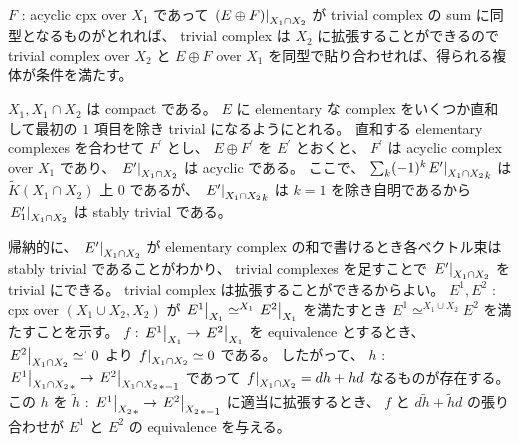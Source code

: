 \documentclass[dvipdfmx]{jsarticle}
\begin{document}
\begin{Proof}[A.2]
\itemprof
  \(F\) : acyclic cpx over \(X_1\) であって \(\left. {(E \oplus F)} \right| _{X_1 \cap X_2}\) が trivial complex の sum に同型となるものがとれれば、 trivial complex は \(X_2\) に拡張することができるので trivial complex over \(X_2\) と \(E \oplus F\) over \(X_1\) を同型で貼り合わせれば、得られる複体が条件を満たす。

  \(X_1 , X_1 \cap X_2\) は compact である。
  \(E\) に elementary な complex をいくつか直和して最初の \(1\) 項目を除き trivial になるようにとれる。
  直和する elementary complexes を合わせて \(F^\prime\) とし、 \(E \oplus F^\prime\) を \(E^\prime\) とおくと、 \(F^\prime\) は acyclic complex over \(X_1\) であり、 \(\left. {E^\prime} \right| _{X_1 \cap X_2}\) は acyclic である。
  ここで、 \(\sum_k (-1)^k {\left. {E^\prime} \right| _{X_1 \cap X_2}}_k\) は \(\tilde{K}(X_1 \cap X_2)\) 上 \(0\) であるが、 \({\left. {E^\prime} \right| _{X_1 \cap X_2}}_k\) は \(k = 1\) を除き自明であるから \(\left. {E^\prime_1} \right| _{X_1 \cap X_2}\) は stably trivial である。
  
  帰納的に、 \(\left. {E^\prime} \right| _{X_1 \cap X_2}\) が elementary complex の和で書けるとき各ベクトル束は stably trivial であることがわかり、 trivial complexes を足すことで \(\left. {E^\prime} \right| _{X_1 \cap X_2}\) を trivial にできる。
  trivial complex は拡張することができるからよい。
\itemprof
  \(E^1 , E^2\) : cpx over \((X_1 \cup X_2 , X_2)\) が \(\left. {E^1} \right| _{X_1} \simeq^{X_1} \left. {E^2} \right| _{X_1}\) を満たすとき \(E^1 \simeq^{X_1 \cup X_2} E^2\) を満たすことを示す。
  \(f\) : \(\left. {E^1} \right| _{X_1} \to \left. {E^2} \right| _{X_1}\) を equivalence とするとき、 \(\left. {E^2} \right| _{X_1 \cap X_2} \simeq^{\cdot} 0\) より \(\left. {f} \right| _{X_1 \cap X_2} \simeq 0\) である。
  したがって、 \(h\) : \({\left. {E^1} \right| _{X_1 \cap X_2}}_{*} \to {\left. {E^2} \right| _{X_1 \cap X_2}}_{*-1}\) であって \(\left. {f} \right| _{X_1 \cap X_2} = d h + h d\) なるものが存在する。
  この \(h\) を \(\tilde{h}\) : \({\left. {E^1} \right| _{X_2}}_{*} \to {\left. {E^2} \right| _{X_2}}_{*-1}\) に適当に拡張するとき、 \(f\) と \(d \tilde{h} + \tilde{h} d\) の張り合わせが \(E^1\) と \(E^2\) の equivalence を与える。
\end{Proof}
\end{document}
